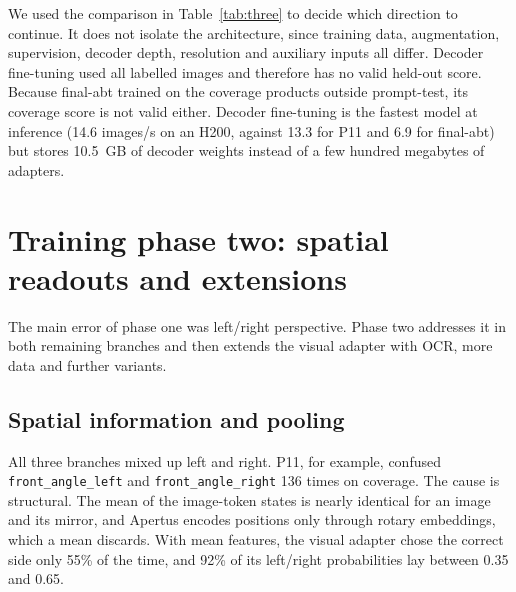 \documentclass[11pt]{article}
\begin{document}
\begin{table}[ht]
\centering
\caption{The three directions. Public dev scores refer to different checkpoints and training configurations, not a controlled ablation. The final visual-adapter checkpoint (\emph{final-abt}) is a three-stage continuation of the first one.}
\label{tab:three}
\end{table}
We used the comparison in Table~\ref{tab:three} to decide which direction to continue. It does not isolate the architecture, since training data, augmentation, supervision, decoder depth, resolution and auxiliary inputs all differ. Decoder fine-tuning used all labelled images and therefore has no valid held-out score. Because final-abt trained on the coverage products outside prompt-test, its coverage score is not valid either. Decoder fine-tuning is the fastest model at inference (14.6 images/s on an H200, against 13.3 for P11 and 6.9 for final-abt) but stores 10.5~GB of decoder weights instead of a few hundred megabytes of adapters.

\section{Training phase two: spatial readouts and extensions}
\label{sec:phase2}
The main error of phase one was left/right perspective. Phase two addresses it in both remaining branches and then extends the visual adapter with OCR, more data and further variants.

\subsection{Spatial information and pooling}
\label{sec:pooling}
All three branches mixed up left and right. P11, for example, confused \texttt{front\_angle\_left} and \texttt{front\_angle\_right} 136 times on coverage. The cause is structural. The mean of the image-token states is nearly identical for an image and its mirror, and Apertus encodes positions only through rotary embeddings, which a mean discards. With mean features, the visual adapter chose the correct side only 55\% of the time, and 92\% of its left/right probabilities lay between 0.35 and 0.65.
\end{document}

